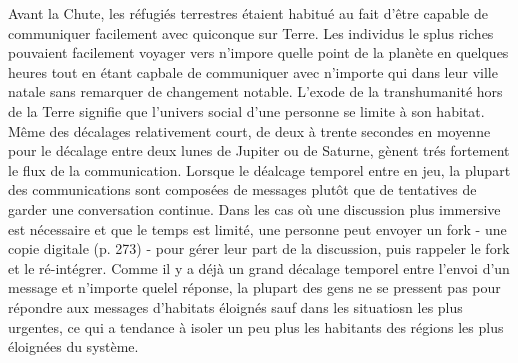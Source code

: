 Avant la Chute, les réfugiés terrestres étaient habitué au fait d'être capable de communiquer facilement avec quiconque sur Terre. Les individus le splus riches pouvaient facilement voyager vers n'impore quelle point de la planète en quelques heures tout en étant capbale de communiquer avec n'importe qui dans leur ville natale sans remarquer de changement notable. L'exode de la transhumanité hors de la Terre signifie que l'univers social d'une personne se limite à son habitat. Même des décalages relativement court, de deux à trente secondes en moyenne pour le décalage entre deux lunes de Jupiter ou de Saturne, gènent trés fortement le flux de la communication. Lorsque le déalcage temporel entre en jeu, la plupart des communications sont composées de messages plutôt que de tentatives de garder une conversation continue. Dans les cas où une discussion plus immersive est nécessaire et que le temps est limité, une personne peut envoyer un fork - une copie digitale (p. 273) - pour gérer leur part de la discussion, puis rappeler le fork et le ré-intégrer. Comme il y a déjà un grand décalage temporel entre l'envoi d'un message et n'importe quelel réponse, la plupart des gens ne se pressent pas pour répondre aux messages d'habitats éloignés sauf dans les situatiosn les plus urgentes, ce qui a tendance à isoler un peu plus les habitants des régions les plus éloignées du système. 


